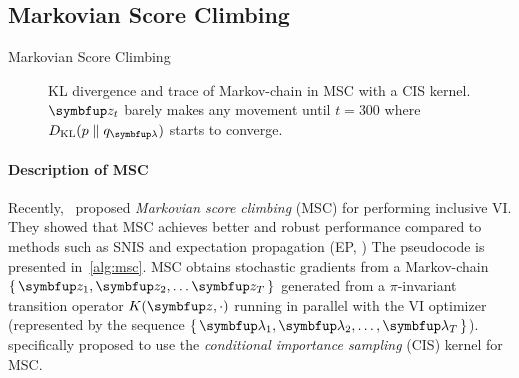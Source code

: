 \subsection{Markovian Score Climbing}\label{section:msc}
%
  \begin{minipage}[l]{0.45\linewidth}
    \small
    \centering
    \begin{algorithm2e}[H]
      \DontPrintSemicolon
      \SetAlgoLined
      \caption{Markovian Score Climbing}\label{alg:msc}
    \end{algorithm2e}
  \end{minipage}
  \qquad
  \begin{minipage}[r]{0.5\linewidth}
    \begin{figure}[H]
      \centering
      
      \caption{KL divergence and trace of Markov-chain in MSC with a CIS kernel.
        \(\vz_t\) barely makes any movement until \(t=300\) where \(\DKL{p}{q_{\vlambda}}\) starts to converge.}\label{fig:motivating}
    \end{figure}
  \end{minipage}
%
%
\vspace{-0.1in}
\paragraph{Description of MSC}
Recently,~\citet{NEURIPS2020_b2070693} proposed \textit{Markovian score climbing} (MSC) for performing inclusive VI.
They showed that MSC achieves better and robust performance compared to methods such as SNIS and expectation propagation (EP, \citealt{10.5555/2074022.2074067})
The pseudocode is presented in~\cref{alg:msc}.
MSC obtains stochastic gradients from a Markov-chain \(\{\,\vz_1, \vz_2, \ldots \vz_T\,\}\) generated from a \(\pi\)-invariant transition operator \(K(\vz, \cdot)\) running in parallel with the VI optimizer (represented by the sequence \(\{\,\vlambda_1, \vlambda_2, \ldots, \vlambda_T\,\}\)).
\citeauthor{NEURIPS2020_b2070693} specifically proposed to use the \textit{conditional importance sampling} (CIS) kernel for MSC.


